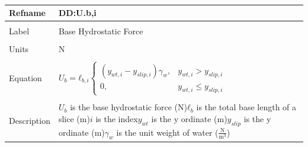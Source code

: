 \documentclass[12pt]{article}
\begin{document}
~\newline
\noindent \begin{minipage}{\textwidth}
\begin{tabular}{p{} p{}}
\toprule \textbf{Refname} & \textbf{DD:U.b,i}
\label{DD:U.b,i}
\\ \midrule \\
Label & Base Hydrostatic Force
\\ \midrule \\
Units & N
\\ \midrule \\
Equation & ${U_{b}}={ℓ_{b,i}} \begin{cases}
\left({y_{wt,i}}-{y_{slip,i}}\right) {γ_{w}}, & {y_{wt,i}}>{y_{slip,i}}\\
0, & {y_{wt,i}}\leq{}{y_{slip,i}}
\end{cases}$
\\ \midrule \\
Description & ${U_{b}}$ is the base hydrostatic force (N)\newline${ℓ_{b}}$ is the total base length of a slice (m)\newline$i$ is the index\newline${y_{wt}}$ is the y ordinate (m)\newline${y_{slip}}$ is the y ordinate (m)\newline${γ_{w}}$ is the unit weight of water ($\frac{\text{N}}{\text{m}^{3}}$)
\\ \bottomrule \end{tabular}
\end{minipage}\\
~\newline
\end{document}
